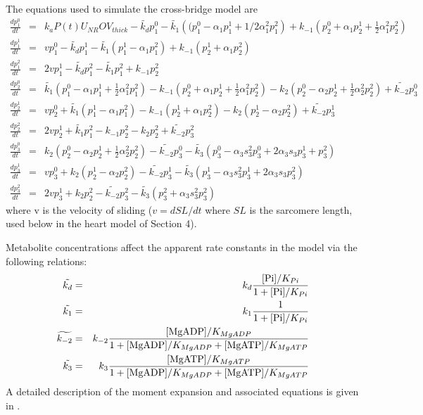 \documentclass[fleqn,10pt]{physiome}
\begin{document}
The equations used to simulate the cross-bridge model are
\begin{eqnarray}\label{eq:equations_crossbridge}
\frac{dp_1^0}{dt} &=& k_a P(t)  U_{NR} OV_{thick} - \tilde{k_d} p_1^0 - 
    \tilde{k_1}\left((p_1^0-\alpha_1 p_1^1+1/2 \alpha_1^2 p_1^2\right) + 
    k_{-1} \left( p_2^0+\alpha_1 p_2^1+ \frac{1}{2}\alpha_1^2 p_2^2  \right) \nonumber \\
\frac{dp_1^1}{dt} &=& v p_1^0 - \tilde{k_d} p_1^1 - 
    \tilde{k_1} \left( p_1^1-\alpha_1 p_1^2 \right) 
    + k_{-1} \left(p_2^1 + \alpha_1 p_2^2 \right) \nonumber \\
\frac{dp_1^2}{dt} &=& 2vp_1^1 - \tilde{k_d} p_1^2 - 
    \tilde{k_1} p_1^2 + k_{-1} p_2^2 \nonumber \\
\frac{dp_2^0}{dt} &=& \tilde{k_1}\left(p_1^0 - \alpha_1 p_1^1 + 
    \frac{1}{2} \alpha_1^2 p_1^2 \right) - k_{-1} \left(p_2^0 + 
    \alpha_1 p_2^1 + \frac{1}{2} \alpha_1^2 p_2^2\right) -  
     k_2 \left(p_2^0 - \alpha_2 p_2^1 + \frac{1}{2} \alpha_2^2 p_2^2 \right) + 
     \widetilde{k_{-2}}p_3^0 \nonumber \\
\frac{dp_2^1}{dt} &=& v p_2^0  +\tilde{k_1}\left(p_1^1-\alpha_1 p_1^2 \right) - 
    k_{-1}\left(p_2^1 + \alpha_1 p_2^2 \right) - k_2 \left(p_2^1-\alpha_2 p_2^2 \right) + 
    \widetilde{k_{-2}}p_3^1 \nonumber \\
\frac{dp_2^2}{dt} &=& 2v p_2^1  +\tilde{k_1}p_1^2 - k_{-1} p_2^2 - 
    k_2 p_2^2+ \widetilde{k_{-2}}p_3^2 \nonumber \\
\frac{dp_3^0}{dt} &=& k_2 \left(p_2^0 - \alpha_2 p_2^1 + 
    \frac{1}{2}\alpha_2^2 p_2^2 \right) - \widetilde{k_{-2}}p_3^0  - 
    \tilde{k_3}\left(p_3^0 - \alpha_3 s_3^2 p_3^0 + 
    2\alpha_3 s_3 p_3^1+p_3^2 \right) \nonumber \\	
\frac{dp_3^1}{dt} &=& v p_3^0 + k_2 \left(p_2^1 - \alpha_2 p_2^2 \right) - 
    \widetilde{k_{-2}}p_3^1 - \tilde{k_3}\left(p_3^1 - \alpha_3 s_3^2 p_3^1 + 2\alpha_3 s_3 p_3^2 \right) \nonumber \\
\frac{dp_3^2}{dt} &=& 2v p_3^1+k_2 p_2^2- \widetilde{k_{-2}}p_3^2  - 
    \tilde{k_3}\left(p_3^2+\alpha_3 s_3^2 p_3^2 \right)
\end{eqnarray}
where v is the velocity of sliding ($v=dSL/dt$ where $SL$ is the sarcomere length, used below in the heart model of Section 4).

Metabolite concentrations affect the apparent rate constants in the model via the following relations:
\begin{eqnarray}
\tilde{k_d}     &=&  k_d  \frac{ [{\rm Pi}]/K_{Pi} }{1+ [{\rm Pi}]/K_{Pi} } 	\nonumber \\
\tilde{k_1}     &=&  k_1  \frac{1}{1+ [{\rm Pi}]/K_{Pi} } 	\nonumber \\
\widetilde{k_{-2} } &=& k_{-2}  \frac{[{\rm MgADP}]/K_{MgADP} }
    {1+ [{\rm MgADP}]/K_{MgADP} + [{\rm MgATP}]/K_{MgATP} } \nonumber \\				
\tilde{k_3}     &=& k_3      \frac{[{\rm MgATP}]/K_{MgATP} }
    {1+ [{\rm MgADP}]/K_{MgADP} + [{\rm MgATP}]/K_{MgATP} } 							
\end{eqnarray}
A detailed description of the moment expansion and associated equations is given in \cite{Tewari2016a}. 
\end{document}
